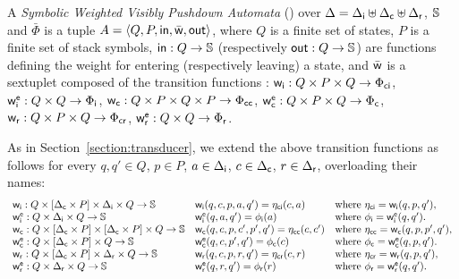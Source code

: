 \begin{definition}
A \emph{Symbolic Weighted Visibly Pushdown Automata} (\SWVPA)
over  $\Delta = {\Delta_\mathsf{i}} \uplus {\Delta_\mathsf{c}} \uplus {\Delta_\mathsf{r}}$, $\mathbb{S}$ and $\bar\Phi$
is a tuple $A = \< Q, P, \init, \bar\wei, \final >$,
where $Q$ is a finite set of states,
$P$ is a finite set of stack symbols,
$\mathsf{in} : Q \to \mathbb{S}$
(respectively $\mathsf{out} : Q \to \mathbb{S}$)
are functions defining the weight for entering
(respectively leaving) a state,
and $\bar{\mathsf{w}}$ is a sextuplet composed of the transition functions :
${\mathsf{w}_\mathsf{i}} : Q \times P \times Q \to {\Phi_\mathsf{ci}}$,
$\weiei : Q \times Q \to \Phii$,
${\mathsf{w}_\mathsf{c}} : Q \times P \times Q \times P \to {\Phi_\mathsf{cc}}$,
$\weiec : Q \times P \times Q \to \Phic$,
${\mathsf{w}_\mathsf{r}} : Q \times P \times Q \to {\Phi_\mathsf{cr}}$,
$\weier : Q \times Q \to \Phir$.
\end{definition}
%
As in Section~\ref{section:transducer},
we extend the above transition functions as follows
for every $q, q' \in Q$, $p \in P$,
$a \in {\Delta_\mathsf{i}}$,
$c \in {\Delta_\mathsf{c}}$,
$r \in {\Delta_\mathsf{r}}$,
overloading their names: %
\[
\begin{array}{lll}
\weii: Q \times [\Deltac \times P] \times \Deltai \times Q \to \Semiring &
\weii(q, c, p, a, q') = \eta_\mathsf{ci}(c, a) &
\mathrm{where~} \eta_\mathsf{ci} = \weii(q, p, q'),\\
%
\weiei: Q \times \Deltai \times Q \to \Semiring &
\weiei(q, a, q') = \phi_\mathsf{i}(a) &
\mathrm{where~} \phi_\mathsf{i} = \weiei(q, q').\\
%
\weic: Q \times [\Deltac \times P] \times  [\Deltac \times P] \times Q \to \Semiring &
\weic(q, c, p, \call{c'}, p', q') = \eta_\mathsf{cc}(c, \call{c'}) &
\mathrm{where~} \eta_\mathsf{cc} = \weic(q, p, p', q'),\\
%
\weiec: Q \times [\Deltac \times P] \times Q \to \Semiring &
\weiec(q, {\call{c}}, p', q') = \phi_\mathsf{c}({\call{c}}) &
\mathrm{where~} \phi_\mathsf{c} = \weiec(q, p, q').\\
%
\weir: Q \times [\Deltac \times P] \times \Deltar \times Q \to \Semiring &
\weir(q, {\call{c}},  p, {\return{r}}, q') = \eta_\mathsf{cr}({\call{c}},  {\return{r}}) &
\mathrm{where~} \eta_\mathsf{cr} = \weir(q, p, q'),\\
%
\weier: Q \times \Deltar \times Q \to \Semiring &
\weier(q, {\return{r}}, q') = \phi_\mathsf{r}({\return{r}}) &
\mathrm{where~} \phi_\mathsf{r} = \weier(q, q').\\
\end{array}
\]


